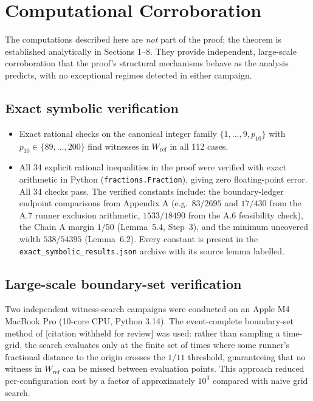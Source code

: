 \documentclass[12pt]{article}
\begin{document}
\section{Computational Corroboration}

The computations described here are \emph{not} part of the proof; the theorem is
established analytically in Sections 1--8. They provide independent, large-scale
corroboration that the proof's structural mechanisms behave as the analysis predicts,
with no exceptional regimes detected in either campaign.

\subsection{Exact symbolic verification}

\begin{itemize}
\item Exact rational checks on the canonical integer family $\{1,\ldots,9,p_{10}\}$
  with $p_{10}\in\{89,\ldots,200\}$ find witnesses in $W_{\mathrm{ref}}$ in all 112 cases.
\item All 34 explicit rational inequalities in the proof were verified with exact
  arithmetic in Python (\texttt{fractions.Fraction}), giving zero floating-point error. All
  34 checks pass. The verified constants include: the boundary-ledger endpoint comparisons
  from Appendix A (e.g.\ $83/2695$ and $17/430$ from the A.7 runner exclusion arithmetic,
  $1533/18490$ from the A.6 feasibility check), the Chain A margin $1/50$ (Lemma~5.4,
  Step~3), and the minimum uncovered width $538/54395$ (Lemma~6.2). Every constant is
  present in the \texttt{exact\_symbolic\_results.json} archive with its source lemma
  labelled.
\end{itemize}

\subsection{Large-scale boundary-set verification}

Two independent witness-search campaigns were conducted on an Apple M4 MacBook Pro
(10-core CPU, Python 3.14). The event-complete boundary-set method of [citation withheld for review] was used:
rather than sampling a time-grid, the search evaluates only at the finite set of times
where some runner's fractional distance to the origin crosses the $1/11$ threshold,
guaranteeing that no witness in $W_{\mathrm{ref}}$ can be missed between evaluation points.
This approach reduced per-configuration cost by a factor of approximately $10^3$ compared
with naive grid search.
\end{document}
